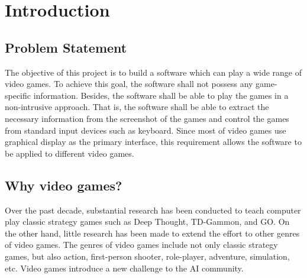 
\chapter{Introduction}
\label{ch:intro}

\section{Problem Statement}
The objective of this project is to build a software which can play a wide range 
of video games. To achieve this goal, the software shall not possess any game-specific 
information. Besides, the software shall be able to play the games in a non-intrusive approach.
That is, the software shall be able to extract the necessary information 
from the screenshot of the games and control the games from standard input devices such as keyboard.
Since most of video games use graphical display as the primary interface, this requirement allows
the software to be applied to different video games.

\section{Why video games?}
Over the past decade, substantial research has been conducted to teach computer play classic strategy games such
as Deep Thought\cite{DeepBlue}, TD-Gammon\cite{Gammon}, and GO\cite{Go}.
On the other hand, little research has been made\cite{FPS}\cite{Mario} to extend the effort to other genres of video games.
The genres of video games include not only classic strategy games, but also action, first-person shooter, role-player, adventure, simulation, etc.
Video games introduce a new challenge to the AI community.

